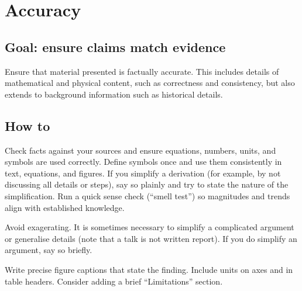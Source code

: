 \documentclass[
  a4paper,
  DIV=11,
  numbers=noendperiod,
  oneside]{scrreprt}
\begin{document}
\section{Accuracy}\label{sec-pres-accuracy}

\subsection{Goal: ensure claims match
evidence}\label{goal-ensure-claims-match-evidence}

Ensure that material presented is factually accurate. This includes
details of mathematical and physical content, such as correctness and
consistency, but also extends to background information such as
historical details.

\subsection{How to}\label{how-to-8}

Check facts against your sources and ensure equations, numbers, units,
and symbols are used correctly. Define symbols once and use them
consistently in text, equations, and figures. If you simplify a
derivation (for example, by not discussing all details or steps), say so
plainly and try to state the nature of the simplification. Run a quick
sense check (``smell test'') so magnitudes and trends align with
established knowledge.

\begin{tcolorbox}[enhanced jigsaw, colframe=quarto-callout-note-color-frame, title=\textcolor{quarto-callout-note-color}{\faInfo}\hspace{0.5em}{Talk Accuracy}, breakable, opacityback=0, titlerule=0mm, colbacktitle=quarto-callout-note-color!10!white, toptitle=1mm, colback=white, coltitle=black, toprule=.15mm, bottomtitle=1mm, left=2mm, arc=.35mm, rightrule=.15mm, bottomrule=.15mm, opacitybacktitle=0.6, leftrule=.75mm]

Avoid exagerating. It is sometimes necessary to simplify a complicated
argument or generalise details (note that a talk is not written report).
If you do simplify an argument, say so briefly.

\end{tcolorbox}

\begin{tcolorbox}[enhanced jigsaw, colframe=quarto-callout-note-color-frame, title=\textcolor{quarto-callout-note-color}{\faInfo}\hspace{0.5em}{Poster Accuracy}, breakable, opacityback=0, titlerule=0mm, colbacktitle=quarto-callout-note-color!10!white, toptitle=1mm, colback=white, coltitle=black, toprule=.15mm, bottomtitle=1mm, left=2mm, arc=.35mm, rightrule=.15mm, bottomrule=.15mm, opacitybacktitle=0.6, leftrule=.75mm]

Write precise figure captions that state the finding. Include units on
axes and in table headers. Consider adding a brief ``Limitations''
section.

\end{tcolorbox}
\end{document}
